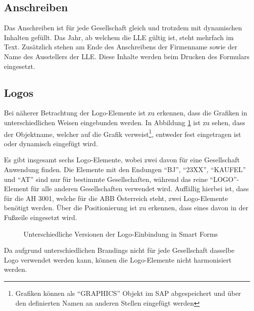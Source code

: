 	\subsection{Anschreiben}
	
	Das Anschreiben ist für jede Gesellschaft gleich und trotzdem mit dynamischen Inhalten gefüllt. Das Jahr, ab welchem die \ac{LLE} gültig ist, steht mehrfach im Text. Zusätzlich stehen am Ende des Anschreibens der Firmenname sowie der Name des Ausstellers der \ac{LLE}. Diese Inhalte werden beim Drucken des Formulars eingesetzt.	
	
	\subsection{Logos}
	\label{ist_logos}
	
	Bei näherer Betrachtung der Logo-Elemente ist zu erkennen, dass die Grafiken in unterschiedlichen Weisen eingebunden werden. In Abbildung \ref{logo_smart} ist zu sehen, dass der Objektname, welcher auf die Grafik verweist\footnote{Grafiken können als "`GRAPHICS"' Objekt im SAP abgespeichert und über den definierten Namen an anderen Stellen eingefügt werden}, entweder fest eingetragen ist oder dynamisch eingefügt wird. 
	

	Es gibt insgesamt sechs Logo-Elemente, wobei zwei davon für eine Gesellschaft Anwendung finden. Die Elemente mit den Endungen "`BJ"', "`23XX"', "`KAUFEL"' und "`AT"' sind nur für bestimmte Gesellschaften, während das reine "`LOGO"'-Element für alle anderen Gesellschaften verwendet wird. Auffällig hierbei ist, dass für die \ac{AH} 3001, welche für die \ac{ABB} Österreich steht, zwei Logo-Elemente benötigt werden.
	Über die Positionierung ist zu erkennen, dass eines davon in der Fußzeile eingesetzt wird.
	
		\begin{figure}[ht]
		\centering
		\caption{Unterschiedliche Versionen der Logo-Einbindung in Smart Forms}
		\label{logo_smart}
	\end{figure} 
	Da aufgrund unterschiedlichen Brandings nicht für jede Gesellschaft dasselbe Logo verwendet werden kann, können die Logo-Elemente nicht harmonisiert werden.
	
